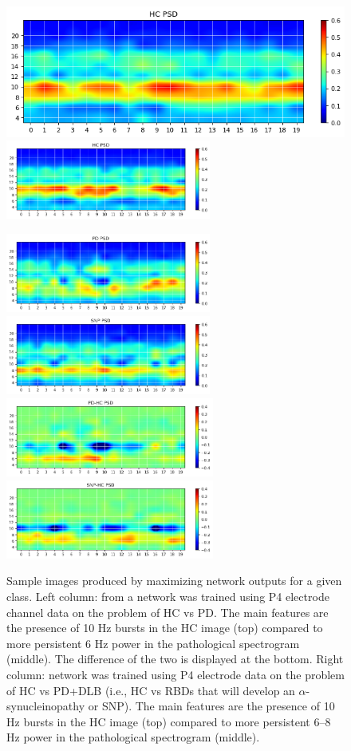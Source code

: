 \documentclass[review]{elsarticle}
\begin{document}
\begin{figure}[h]
	\centering
		\includegraphics[height=2.6 cm]{figures/HC_HCvsPD} \includegraphics[height=2.6cm]{figures/HC_HCvsSNP}
		
				\includegraphics[height=2.6cm]{figures/PD_HCvsPD} \includegraphics[height=2.6cm]{figures/SNP_HCvsSNP} 
		\includegraphics[height=2.6cm]{figures/diff_HCvsPD} \includegraphics[height=2.6cm]{figures/diff_HCvsSNP}

	\caption{Sample images produced by maximizing network outputs for a given class. Left column: from a network was trained using P4 electrode channel data on the problem of HC vs PD. The main features are the presence of 10 Hz bursts in the HC image (top) compared to more persistent 6 Hz power in the pathological spectrogram (middle). The difference of the two is displayed at the bottom. Right column: network was trained using P4 electrode data on the problem of HC vs PD+DLB (i.e., HC vs RBDs that will develop an $\alpha$-synucleinopathy or SNP). The main features are the presence of 10 Hz bursts in the HC image (top) compared to more persistent 6--8 Hz power in the pathological spectrogram (middle). }
	\label{fig:dream}
\end{figure}
\end{document}
